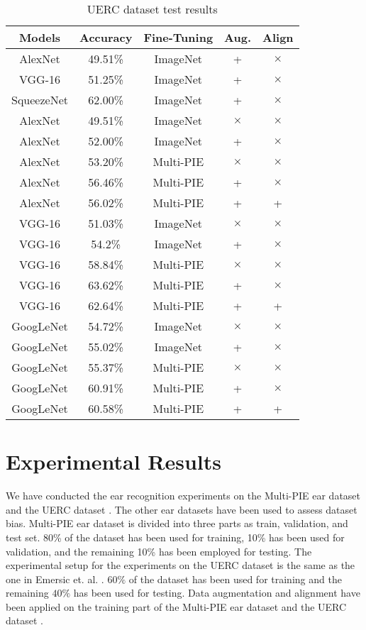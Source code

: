 \documentclass[11pt,journal,compsoc]{IEEEtran}
\begin{document}
\begin{table}[!b]
\renewcommand{\arraystretch}{1.3}
\caption{UERC dataset test results}
\label{UERC_results}
\centering
\begin{tabular}{|c|c|c|c|c|}
\hline
Models & Accuracy & Fine-Tuning & Aug. & Align\\
\hline
AlexNet \cite{Emersic_2017_c} & 49.51\% & ImageNet & + & $\times$ \\
\hline
VGG-16 \cite{Emersic_2017_c} & 51.25\% & ImageNet & + & $\times$ \\
\hline
SqueezeNet \cite{Emersic_2017_c} & 62.00\% & ImageNet & + & $\times$ \\
\hline
AlexNet & 49.51\% & ImageNet & $\times$ & $\times$ \\
\hline
AlexNet & 52.00\%  & ImageNet & + & $\times$ \\
\hline
AlexNet & 53.20\% & Multi-PIE & $\times$ & $\times$ \\
\hline
AlexNet & 56.46\% & Multi-PIE & + & $\times$ \\
\hline
AlexNet & 56.02\% & Multi-PIE & + & + \\
\hline
VGG-16 & 51.03\% & ImageNet & $\times$ & $\times$ \\
\hline
VGG-16 & 54.2\% & ImageNet & + & $\times$ \\
\hline
VGG-16 & 58.84\% & Multi-PIE & $\times$ & $\times$ \\
\hline
VGG-16 & 63.62\% & Multi-PIE & + & $\times$\\
\hline
VGG-16 & 62.64\% & Multi-PIE & + & + \\
\hline
GoogLeNet & 54.72\% & ImageNet & $\times$ & $\times$ \\
\hline
GoogLeNet & 55.02\% & ImageNet & + & $\times$ \\
\hline
GoogLeNet & 55.37\% & Multi-PIE & $\times$ & $\times$ \\
\hline
GoogLeNet & 60.91\% & Multi-PIE & + & $\times$ \\
\hline
GoogLeNet & 60.58\% & Multi-PIE & + & + \\
\hline
\end{tabular}
\end{table}



\section{Experimental Results}\label{sec3}
We have conducted the ear recognition experiments on the Multi-PIE ear dataset and the UERC dataset \cite{Emersic_2017_b}. The other ear datasets have been used to assess dataset bias. Multi-PIE ear dataset is divided into three parts as train, validation, and test set. 80\% of the dataset has been used for training, 10\% has been used for validation, and the remaining 10\% has been employed for testing. The experimental setup for the experiments on the UERC dataset \cite{Emersic_2017_b} is the same as the one in Emersic et. al. \cite{Emersic_2017_c}. $60\%$ of the dataset has been used for training and the remaining $40\%$ has been used for testing. Data augmentation and alignment have been applied on the training part of the Multi-PIE ear dataset and the UERC dataset \cite{Emersic_2017_b}.
\end{document}
